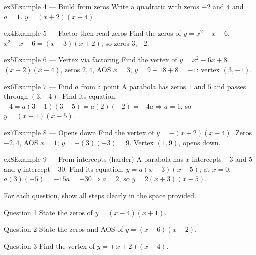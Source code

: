 \documentclass[11pt]{article}
\begin{document}
\begin{example}{ex3}{Example 4 --- Build from zeros}
Write a quadratic with zeros $-2$ and $4$ and $a=1$.
\soln $y=(x+2)(x-4).$
\end{example}

\begin{example}{ex4}{Example 5 --- Factor then read zeros}
Find the zeros of $y=x^2-x-6$.
\soln $x^2-x-6=(x-3)(x+2)$, so zeros $3,-2.$
\end{example}

\begin{example}{ex5}{Example 6 --- Vertex via factoring}
Find the vertex of $y=x^2-6x+8$.
\soln $(x-2)(x-4)$, zeros $2,4$, AOS $x=3$, $y=9-18+8=-1$: vertex $(3,-1)$.
\end{example}

\begin{example}{ex6}{Example 7 --- Find $a$ from a point}
A parabola has zeros $1$ and $5$ and passes through $(3,-4)$. Find its equation.
\soln $-4=a(3-1)(3-5)=a(2)(-2)=-4a\Rightarrow a=1$, so $y=(x-1)(x-5).$
\end{example}

\begin{example}{ex7}{Example 8 --- Opens down}
Find the vertex of $y=-(x+2)(x-4)$.
\soln Zeros $-2,4$, AOS $x=1$; $y=-(3)(-3)=9$. Vertex $(1,9)$, opens down.
\end{example}

\begin{example}{ex8}{Example 9 --- From intercepts (harder)}
A parabola has $x$-intercepts $-3$ and $5$ and $y$-intercept $-30$. Find its equation.
\soln $y=a(x+3)(x-5)$; at $x=0$: $a(3)(-5)=-15a=-30\Rightarrow a=2$, so $y=2(x+3)(x-5).$
\end{example}

\clearpage
{}
For each question, show all steps clearly in the space provided.

\begin{qbox}{Question 1}
State the zeros of $y=(x-4)(x+1)$.\workspace{1.8cm}
\end{qbox}

\begin{qbox}{Question 2}
State the zeros and AOS of $y=(x-6)(x-2)$.\workspace{2.0cm}
\end{qbox}

\begin{qbox}{Question 3}
Find the vertex of $y=(x+2)(x-4)$.\workspace{2.2cm}
\end{qbox}
\end{document}
